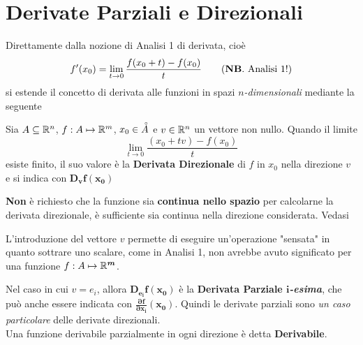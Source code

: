 \section{Derivate Parziali e Direzionali}
Direttamente dalla nozione di Analisi 1 di derivata, cioè
\begin{align*}
	f'(x_0) = \lim\limits_{t \to 0} \frac{f(x_0 + t) - f(x_0)}{t} \tag{\textbf{NB}. Analisi 1!}
\end{align*}
si estende il concetto di derivata alle funzioni in spazi $n$\textit{-dimensionali} mediante la seguente
\begin{definition}
	\label{def:deriv_direz}
	Sia $A \subseteq \mathbb{R}^n$, $f: A \mapsto \mathbb{R}^m$, $x_0 \in \accentset{\circ}{A}$ e $v \in \mathbb{R}^n$ un vettore non nullo. Quando il limite
	\[\lim\limits_{t \to 0} \frac{(x_0 + tv) - f(x_0)}{t}\]
	esiste finito, il suo valore è la \textbf{Derivata Direzionale} di $f$ in $x_0$ nella direzione $v$ e si indica con $\boldsymbol{D_v f(x_0)}$
	\begin{note}
		\textbf{Non} è richiesto che la funzione sia \textbf{continua nello spazio} per calcolarne la derivata direzionale, è sufficiente sia continua nella direzione considerata. Vedasi 
	\end{note}
	\begin{note}
		L'introduzione del vettore $v$ permette di eseguire un'operazione "sensata" in quanto sottrare uno scalare, come in Analisi 1, non avrebbe avuto significato per una funzione $f: A \mapsto \mathbb{R}^{\boldsymbol{m}}$.
	\end{note}

	Nel caso in cui $v = e_i$, allora $\boldsymbol{D_{e_i} f(x_0)}$ è la \textbf{Derivata Parziale $\boldsymbol{i}$\textit{-esima}}, che può anche essere indicata con $\boldsymbol{\frac{\partial f}{\partial x_i}(x_0)}$. Quindi le derivate parziali sono \textit{un caso particolare} delle derivate direzionali.\\

	\noindent Una funzione derivabile parzialmente in ogni direzione è detta \textbf{Derivabile}.


\end{definition}
